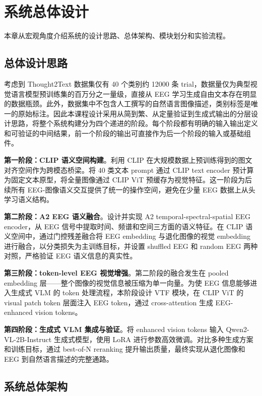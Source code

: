 \section{系统总体设计}

本章从宏观角度介绍系统的设计思路、总体架构、模块划分和实验流程。

\subsection{总体设计思路}

考虑到 Thought2Text 数据集仅有 40 个类别约 12000 条 trial，数据量仅为典型视觉语言模型预训练集的百万分之一量级，直接从 EEG 学习生成自由文本存在明显的数据瓶颈。此外，数据集中不包含人工撰写的自然语言图像描述，类别标签是唯一的原始标注。因此本课程设计采用从简到繁、从定量验证到生成式输出的分层设计思路，将整个系统构建分为四个递进的阶段。每个阶段都有明确的输入输出定义和可验证的中间结果，前一个阶段的输出可直接作为后一个阶段的输入或基础组件。

\textbf{第一阶段：CLIP 语义空间构建}。利用 CLIP 在大规模数据上预训练得到的图文对齐空间作为跨模态桥梁。将 40 类文本 prompt 通过 CLIP text encoder 预计算为固定文本原型，将全量图像通过 CLIP ViT 预缓存为视觉特征。这一阶段为后续所有 EEG-图像语义交互提供了统一的操作空间，避免在少量 EEG 数据上从头学习语义结构。

\textbf{第二阶段：A2 EEG 语义融合}。设计并实现 A2 temporal-spectral-spatial EEG encoder，从 EEG 信号中提取时间、频谱和空间三方面的语义特征。在 CLIP 语义空间中，通过门控残差融合将 EEG embedding 与退化图像的视觉 embedding 进行融合，以分类损失为主训练目标，并设置 shuffled EEG 和 random EEG 两种对照，严格验证 EEG 语义信息的真实性。

\textbf{第三阶段：token-level EEG 视觉增强}。第二阶段的融合发生在 pooled embedding 层——整个图像的视觉信息被压缩为单一向量。为使 EEG 信息能够进入生成式 VLM 的 token 处理流程，本阶段设计 VTF 模块，在 CLIP ViT 的 visual patch token 层面注入 EEG token，通过 cross-attention 生成 EEG-enhanced vision tokens。

\textbf{第四阶段：生成式 VLM 集成与验证}。将 enhanced vision tokens 输入 Qwen2-VL-2B-Instruct 生成式模型，使用 LoRA 进行参数高效微调。对比多种生成方案和训练目标，通过 best-of-N reranking 提升输出质量，最终实现从退化图像和 EEG 到自然语言描述的完整通路。

\subsection{系统总体架构}

